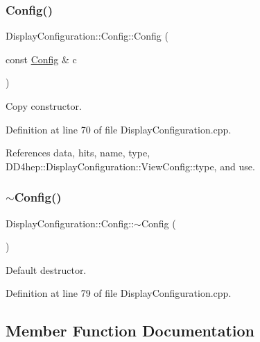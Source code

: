 \subsubsection{\texorpdfstring{Config()}{Config()}\hspace{0.1cm}{\footnotesize\ttfamily [2/2]}}
{\footnotesize\ttfamily Display\+Configuration\+::\+Config\+::\+Config (\begin{DoxyParamCaption}\item[{const \hyperlink{class_d_d4hep_1_1_display_configuration_1_1_config}{Config} \&}]{c }\end{DoxyParamCaption})}



Copy constructor. 



Definition at line 70 of file Display\+Configuration.\+cpp.



References data, hits, name, type, D\+D4hep\+::\+Display\+Configuration\+::\+View\+Config\+::type, and use.

\hypertarget{class_d_d4hep_1_1_display_configuration_1_1_config_a3ae52820778d8b7cdf70518bc1504c8f}{}\label{class_d_d4hep_1_1_display_configuration_1_1_config_a3ae52820778d8b7cdf70518bc1504c8f} 
\subsubsection{\texorpdfstring{$\sim$\+Config()}{~Config()}}
{\footnotesize\ttfamily Display\+Configuration\+::\+Config\+::$\sim$\+Config (\begin{DoxyParamCaption}{ }\end{DoxyParamCaption})}



Default destructor. 



Definition at line 79 of file Display\+Configuration.\+cpp.



\subsection{Member Function Documentation}
\hypertarget{class_d_d4hep_1_1_display_configuration_1_1_config_a4fd5de82887e43ea1a99204c73e13c47}{}\label{class_d_d4hep_1_1_display_configuration_1_1_config_a4fd5de82887e43ea1a99204c73e13c47} 
